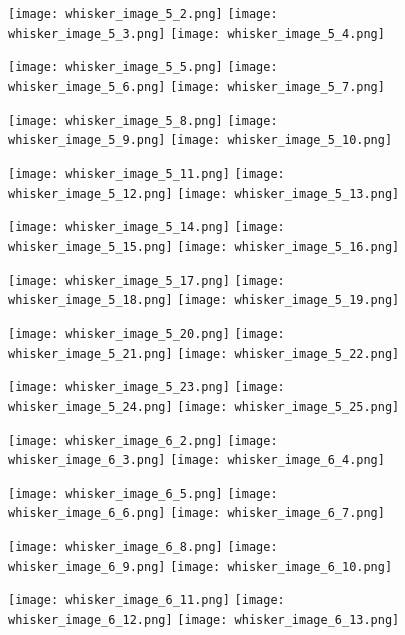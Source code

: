 \documentclass[12pt]{article}
\begin{document}
\begin{figure}
	\centerline{
		\texttt{[image: whisker\_image\_5\_2.png]}
		\texttt{[image: whisker\_image\_5\_3.png]}
		\texttt{[image: whisker\_image\_5\_4.png]}
	}
	\centerline{
		\texttt{[image: whisker\_image\_5\_5.png]}
		\texttt{[image: whisker\_image\_5\_6.png]}
		\texttt{[image: whisker\_image\_5\_7.png]}
	}
	\centerline{
		\texttt{[image: whisker\_image\_5\_8.png]}
		\texttt{[image: whisker\_image\_5\_9.png]}
		\texttt{[image: whisker\_image\_5\_10.png]}
	}
	\centerline{
		\texttt{[image: whisker\_image\_5\_11.png]}
		\texttt{[image: whisker\_image\_5\_12.png]}
		\texttt{[image: whisker\_image\_5\_13.png]}
	}
\end{figure}

\begin{figure}
	\centerline{
		\texttt{[image: whisker\_image\_5\_14.png]}
		\texttt{[image: whisker\_image\_5\_15.png]}
		\texttt{[image: whisker\_image\_5\_16.png]}
	}
	\centerline{
		\texttt{[image: whisker\_image\_5\_17.png]}
		\texttt{[image: whisker\_image\_5\_18.png]}
		\texttt{[image: whisker\_image\_5\_19.png]}
	}
	\centerline{
		\texttt{[image: whisker\_image\_5\_20.png]}
		\texttt{[image: whisker\_image\_5\_21.png]}
		\texttt{[image: whisker\_image\_5\_22.png]}
	}
	\centerline{
		\texttt{[image: whisker\_image\_5\_23.png]}
		\texttt{[image: whisker\_image\_5\_24.png]}
		\texttt{[image: whisker\_image\_5\_25.png]}
	}
\end{figure}

\begin{figure}
	\centerline{
		\texttt{[image: whisker\_image\_6\_2.png]}
		\texttt{[image: whisker\_image\_6\_3.png]}
		\texttt{[image: whisker\_image\_6\_4.png]}
	}
	\centerline{
		\texttt{[image: whisker\_image\_6\_5.png]}
		\texttt{[image: whisker\_image\_6\_6.png]}
		\texttt{[image: whisker\_image\_6\_7.png]}
	}
	\centerline{
		\texttt{[image: whisker\_image\_6\_8.png]}
		\texttt{[image: whisker\_image\_6\_9.png]}
		\texttt{[image: whisker\_image\_6\_10.png]}
	}
	\centerline{
		\texttt{[image: whisker\_image\_6\_11.png]}
		\texttt{[image: whisker\_image\_6\_12.png]}
		\texttt{[image: whisker\_image\_6\_13.png]}
	}
\end{figure}
\end{document}
